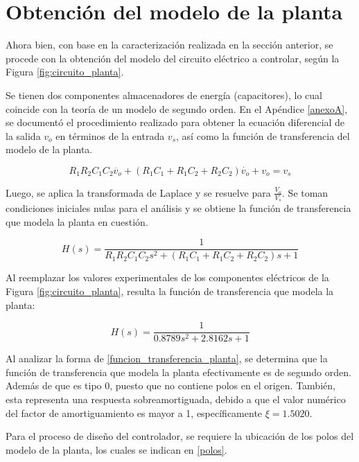 
\section{Obtención del modelo de la planta}
Ahora bien, con base en la caracterización realizada en la sección anterior, se procede con la obtención del modelo del circuito eléctrico a controlar, según la Figura \ref{fig:circuito_planta}.

Se tienen dos componentes almacenadores de energía (capacitores), lo cual coincide con la teoría de un modelo de segundo orden.
En el Apéndice \ref{anexoA}, se documentó el procedimiento realizado para obtener la ecuación diferencial de la salida $v_o$ en términos de la entrada $v_s$, así como la función de transferencia del modelo de la planta.

\begin{equation}
    R_1R_2C_1C_2\ddot{v_o} + (R_1C_1+R_1C_2+R_2C_2)\dot{v_o} + v_o = v_s
\end{equation}

Luego, se aplica la transformada de Laplace y se resuelve para $\frac{V_o}{V_s}$.
Se toman condiciones iniciales nulas para el análisis y se obtiene la función de transferencia que modela la planta en cuestión.

\begin{equation}
    H(s)=\frac{1}{R_1 R_2 C_1 C_2 s^2 + (R_1 C_1 + R_1 C_2 +R_2 C_2)s+1}
\end{equation}

Al reemplazar los valores experimentales de los componentes eléctricos de la Figura \ref{fig:circuito_planta}, resulta la función de transferencia que modela la planta:

\begin{equation} \label{funcion_transferencia_planta}
    H(s)=\frac{1}{0.8789s^2 + 2.8162s+1}
\end{equation}

Al analizar la forma de \eqref{funcion_transferencia_planta}, se determina que la función de transferencia que modela la planta efectivamente es de segundo orden.
Además de que es tipo 0, puesto que no contiene polos en el origen.
También, esta representa una respuesta sobreamortiguada, debido a que el valor numérico del factor de amortiguamiento es mayor a 1, específicamente $\xi =1.5020$.

Para el proceso de diseño del controlador, se requiere la ubicación de los polos del modelo de la planta, los cuales se indican en \eqref{polos}.

